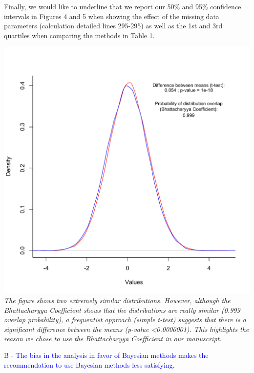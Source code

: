 \documentclass[11pt]{letter}
\begin{document}
\begin{letter}{}
Finally, we would like to underline that we report our 50\% and 95\% confidence intervals in Figures 4 and 5 when showing the effect of the missing data parameters (calculation detailed lines 295-295) as well as the 1st and 3rd quartiles when comparing the methods in Table 1.

\includegraphics[scale=0.8, keepaspectratio=true]{Comparing_distributions.pdf} \\
\textit{The figure shows two extremely similar distributions. However, although the Bhattacharyya Coefficient shows that the distributions are really similar (0.999 overlap probability), a frequentist approach (simple t-test) suggests that there is a significant difference between the means (p-value \textless 0.0000001). This highlights the reason we chose to use the Bhattacharyya Coefficient in our manuscript.}


\textcolor{blue}{B - The bias in the analysis in favor of Bayesian methods makes the recommendation to use Bayesian methods less satisfying.}


\end{letter}
\end{document}
